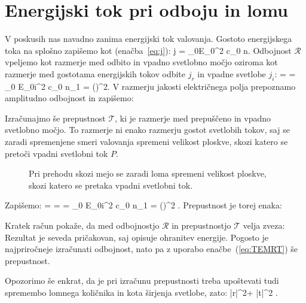 \section{Energijski tok pri odboju in lomu}
V poskusih nas navadno zanima energijski tok valovanja. Gostoto energijskega
toka na splošno zapišemo kot (enačba~\ref{eq:j}):
\beq
j =  \varepsilon_0E_0^2 c_0 n.
\label{eq:04_44}
\eeq
Odbojnost $\mathcal{R}$ vpeljemo kot razmerje med odbito in vpadno svetlobno močjo oziroma
kot razmerje med gostotama energijskih
tokov odbite $j_r$ in vpadne svetlobe $j_i$:
\beq
{} =  = 
{\varepsilon_0 E_{0i}^2 c_0 n_1} = \left(\right)^2\!\!.
\label{eq:04_45}
\eeq
V razmerju jakosti električnega polja prepoznamo amplitudno odbojnost in zapišemo:

Izračunajmo še prepustnost $\mathcal{T}$, ki je razmerje med prepuščeno in vpadno svetlobno 
močjo. To razmerje ni enako razmerju gostot svetlobih tokov, saj se zaradi
spremenjene smeri valovanja spremeni velikost ploskve, skozi
katero se pretoči vpadni svetlobni tok $P$.
\begin{figure}[ht]
\centering
\def\svgwidth{60truemm} 

\caption{Pri prehodu skozi mejo se zaradi loma spremeni velikost
ploskve, skozi katero se pretaka vpadni svetlobni tok.}
\label{fig:04_coscos}
\end{figure}

Zapišemo: 
\beq
{} =  =  =
{\varepsilon_0 E_{0i}^2 c_0 n_1} \frac{\cos\beta}{\cos\alpha}= 
\left(\right)^2 .
\label{eq:04_46}
\eeq
Prepustnost je torej enaka:

Kratek  račun pokaže, da med odbojnostjo $\mathcal{R}$ in prepustnostjo $\mathcal{T}$ velja zveza:
Rezultat je seveda pričakovan, saj opisuje ohranitev energije. Pogosto je najpriročneje
izračunati odbojnost, nato pa z uporabo enačbe~(\ref{eq:TEMRT}) še prepustnost. 

Opozorimo še enkrat, da je pri izračunu prepustnosti treba upoštevati tudi 
spremembo lomnega količnika in kota širjenja svetlobe, zato:
\beq
|r|^2+ |t|^2 .
\label{eq:04_48}
\eeq

